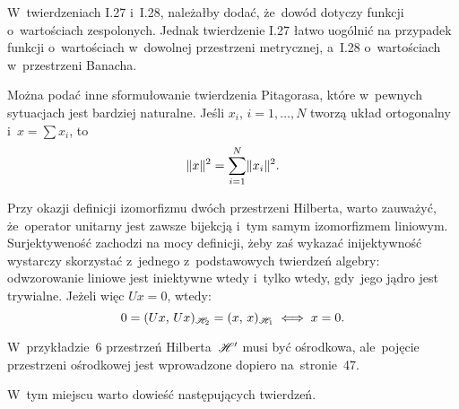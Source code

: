 \documentclass[a4paper,11pt]{article}
\begin{document}
\vspace{\spaceFour}



\start {} W~twierdzeniach I.27 i~I.28, należałby dodać, że~dowód
dotyczy funkcji o~wartościach zespolonych. Jednak twierdzenie I.27
łatwo uogólnić na przypadek funkcji o~wartościach w~dowolnej
przestrzeni metrycznej, a~I.28 o~wartościach w~przestrzeni
Banacha. %

\vspace{\spaceFour}



\start {} Można podać inne sformułowanie twierdzenia Pitagorasa,
które w~pewnych sytuacjach jest bardziej naturalne. Jeśli $x_{ i }$,
$i = 1, \ldots, N$ tworzą układ ortogonalny i~$x = \sum x_{ i }$, to
\begin{equation}
  \label{eq:RS-Vol-I-s01-16}
  \lVert{  x  }\rVert^{ 2 } = \sum_{ i = 1 }^{ N } \lVert{  x_{ i }  }\rVert^{ 2 }.
\end{equation}

\vspace{\spaceFour}



\start {} Przy okazji definicji izomorfizmu dwóch przestrzeni
Hilberta, warto zauważyć, że~operator unitarny jest zawsze bijekcją
i~tym samym izomorfizmem liniowym. Surjektyweność zachodzi na mocy
definicji, żeby zaś wykazać inijektywność wystarczy skorzystać
z~jednego z~podstawowych twierdzeń algebry: odwzorowanie liniowe jest
iniektywne wtedy i~tylko wtedy, gdy~jego jądro jest trywialne. Jeżeli więc $U x = 0$,
wtedy:
\begin{equation*}
  \label{eq:RS-Vol-I-s01-17}
  0 = ( U x, \, U x )_{ \mathcal{H}_{ 2 } } = ( x, \, x )_{ \mathcal{H}_{ 1 } }
  \iff x = 0.
\end{equation*}

\vspace{\spaceFour}



\start {} W~przykładzie~6 przestrzeń Hilberta~$\mathcal{H}'$ musi być
ośrodkowa, ale~pojęcie przestrzeni ośrodkowej jest wprowadzone dopiero
na~stronie~47. %

\vspace{\spaceFour}



\start {} W~tym miejscu warto dowieść następujących twierdzeń.
\end{document}
